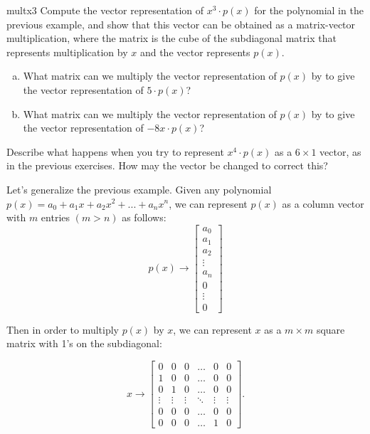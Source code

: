 \begin{exercise}{multx3}
Compute the vector representation of $x^3 \cdot p(x)$ for the polynomial in the previous example, and show that this vector can be obtained as a matrix-vector multiplication, where the matrix is the cube of the subdiagonal matrix that represents multiplication by $x$ and  the vector represents $p(x)$.
\end{exercise}

\begin{exercise}{}
\begin{enumerate}[(a)]
\item
What matrix can we multiply the vector representation of $p(x)$ by to give the vector representation of $5 \cdot p(x)$?
\item
What matrix can we multiply the vector representation of $p(x)$ by to give the vector representation of $-8x \cdot p(x)$?
\end{enumerate}
\end{exercise}

\begin{exercise}{}
Describe what happens when you try to represent $x^4 \cdot p(x)$ as a $6 \times 1$ vector, as in the previous exercises. How may the vector be changed to correct this?
\end{exercise}


Let's generalize the previous example. Given any polynomial $p(x)=a_0+a_1x+a_2x^2+...+a_nx^n$, we can represent $p(x)$ as a column vector with $m$ entries $(m>n)$ as follows:\\
\[p(x) \rightarrow \left[\begin{array}{c}a_0\\a_1\\a_2\\\vdots\\a_n\\0\\\vdots\\0\end{array}\right]\]

Then in order to multiply $p(x)$ by $x$, we can represent $x$ as a $m\times m$ square matrix with 1's on the subdiagonal:

\[x \rightarrow \left[\begin{array}{cccccc}0 & 0 & 0 & \hdots & 0 & 0\\1 & 0 & 0 & \hdots & 0 & 0\\0 & 1 & 0 & \hdots & 0 & 0\\\vdots & \vdots & \vdots & \ddots & \vdots & \vdots\\0 & 0 & 0 & \hdots & 0 & 0\\0 & 0 & 0 & \hdots & 1 & 0\end{array}\right].\]

